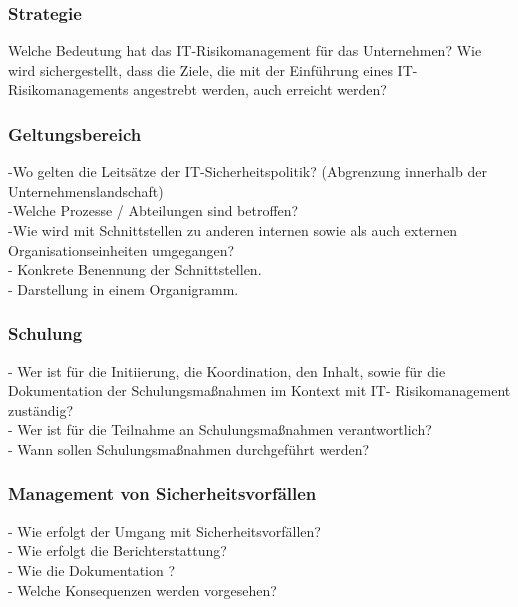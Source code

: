\subsubsection{Strategie}
Welche Bedeutung hat das IT-Risikomanagement für das Unternehmen? 
Wie wird sichergestellt, dass die Ziele, die mit der Einführung eines IT-Risikomanagements angestrebt werden, auch erreicht werden?
\subsubsection{Geltungsbereich}
-Wo gelten die Leitsätze der IT-Sicherheitspolitik? (Abgrenzung innerhalb der Unternehmenslandschaft)
\\-Welche Prozesse / Abteilungen sind betroffen?
\\-Wie wird mit Schnittstellen zu anderen internen sowie als auch externen Organisationseinheiten umgegangen?
\\- Konkrete Benennung der Schnittstellen.
\\- Darstellung in einem Organigramm.
\subsubsection{Schulung}
- Wer ist für die Initiierung, die Koordination, den Inhalt, sowie für die Dokumentation der Schulungsmaßnahmen im Kontext mit IT- Risikomanagement zuständig?
\\- Wer ist für die Teilnahme an Schulungsmaßnahmen verantwortlich?
\\- Wann sollen Schulungsmaßnahmen durchgeführt werden?
\subsubsection{Management von Sicherheitsvorfällen}
- Wie erfolgt der Umgang mit Sicherheitsvorfällen?
\\- Wie erfolgt die Berichterstattung?
\\- Wie die Dokumentation ?
\\- Welche Konsequenzen werden vorgesehen?
\newpage
